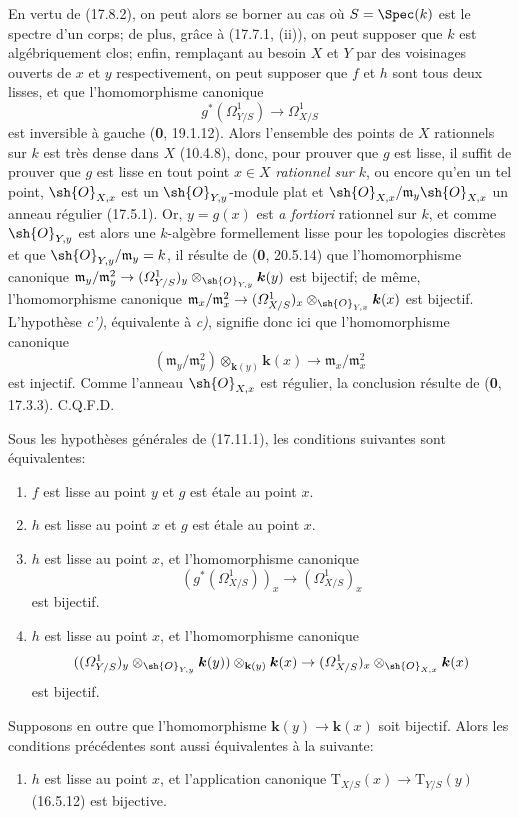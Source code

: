 En vertu de (17.8.2), on peut alors se borner au cas où $S=\Spec(k)$ est le spectre d'un corps; de plus, grâce à (17.7.1, (ii)), on peut supposer que $k$ est algébriquement clos; enfin, remplaçant au besoin $X$ et $Y$ par des voisinages ouverts de $x$ et $y$ respectivement, on peut supposer que $f$ et $h$ sont tous deux lisses, et que l'homomorphisme canonique
\[
g^*(\varOmega^1_{Y/S})\to\varOmega^1_{X/S}
\]
est inversible à gauche (\textbf{0}, 19.1.12). Alors l'ensemble des points de $X$ rationnels sur $k$ est très dense dans $X$ (10.4.8), donc, pour prouver que $g$ est lisse, il suffit de prouver que $g$ est lisse en tout point $x\in X$ \emph{rationnel sur $k$}, ou encore qu'en un tel point, $\sh{O}_{X,x}$ est un $\sh{O}_{Y,y}$-module plat et $\sh{O}_{X,x}/\mathfrak m_y\sh{O}_{X,x}$ un anneau régulier (17.5.1). Or, $y=g(x)$ est
\emph{a fortiori} rationnel sur $k$, et comme $\sh{O}_{Y,y}$ est alors une $k$-algèbre formellement lisse pour les topologies discrètes et que $\sh{O}_{Y,y}/\mathfrak m_y=k$, il résulte de (\textbf{0}, 20.5.14) que l'homomorphisme canonique $\mathfrak m_y/\mathfrak m_y^2\to(\varOmega^1_{Y/S})_y\otimes_{\sh{O}_{Y,y}}\boldsymbol{k}(y)$ est bijectif; de même, l'homomorphisme canonique $\mathfrak m_x/\mathfrak m_x^2\to(\varOmega^1_{X/S})_x\otimes_{\sh{O}_{Y,x}}\boldsymbol{k}(x)$ est bijectif. L'hypothèse \emph{c')}, équivalente à \emph{c)}, signifie donc ici que l'homomorphisme canonique
\[
(\mathfrak m_y/\mathfrak m_y^2)\otimes_{\mathbf{k}(y)}\boldsymbol{k}(x)\to\mathfrak m_x/\mathfrak m_x^2
\]
est injectif. Comme l'anneau $\sh{O}_{X,x}$ est régulier, la conclusion résulte de (\textbf{0}, 17.3.3). C.Q.F.D.

\begin{corollary}[17.11.2]
\label{IV.17.11.2}
Sous les hypothèses générales de \textup{(17.11.1)}, les conditions suivantes sont équivalentes:
\begin{enumerate}
  \item[\textup{a)}] $f$ est lisse au point $y$ et $g$ est étale au point $x$.
  \item[\textup{b)}] $h$ est lisse au point $x$ et $g$ est étale au point $x$.
  \item[\textup{c)}] $h$ est lisse au point $x$, et l'homomorphisme canonique
  \[
  (g^*(\varOmega^1_{X/S}))_x\to(\varOmega^1_{X/S})_x
  \]
  est bijectif.
  \item[\textup{c$'$)}] $h$ est lisse au point $x$, et l'homomorphisme canonique
  \[
  ((\varOmega^1_{Y/S})_y\otimes_{\sh{O}_{Y,y}}\boldsymbol{k}(y))\otimes_{\mathbf{k}(y)}\boldsymbol{k}(x)\to(\varOmega^1_{X/S})_x\otimes_{\sh{O}_{X,x}}\boldsymbol{k}(x)
  \]
  est bijectif.
\end{enumerate}

Supposons en outre que l'homomorphisme $\boldsymbol{k}(y)\to\boldsymbol{k}(x)$ soit bijectif. Alors les conditions précédentes sont aussi équivalentes à la suivante:
\begin{enumerate}
  \item[\textup{d)}] $h$ est lisse au point $x$, et l'application canonique $\mathrm{T}_{X/S}(x)\to\mathrm{T}_{Y/S}(y)$ \textup{(16.5.12)} est bijective.
\end{enumerate}
\end{corollary}

